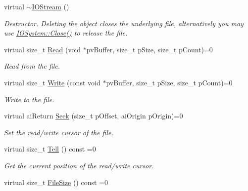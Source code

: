 \begin{DoxyCompactItemize}
\item 
\hypertarget{class_assimp_1_1_i_o_stream_a6cedc5033bf531bf14b97d1c9b788de8}{virtual \hyperlink{class_assimp_1_1_i_o_stream_a6cedc5033bf531bf14b97d1c9b788de8}{$\sim$\+I\+O\+Stream} ()}\label{class_assimp_1_1_i_o_stream_a6cedc5033bf531bf14b97d1c9b788de8}

\begin{DoxyCompactList}\small\item\em Destructor. Deleting the object closes the underlying file, alternatively you may use \hyperlink{class_assimp_1_1_i_o_system_a8c334d60f04bceeb6bd0157d21723f3e}{I\+O\+System\+::\+Close()} to release the file. \end{DoxyCompactList}\item 
virtual size\+\_\+t \hyperlink{class_assimp_1_1_i_o_stream_ae376f641020989d61863b9c6f55c7abf}{Read} (void $\ast$pv\+Buffer, size\+\_\+t p\+Size, size\+\_\+t p\+Count)=0
\begin{DoxyCompactList}\small\item\em Read from the file. \end{DoxyCompactList}\item 
virtual size\+\_\+t \hyperlink{class_assimp_1_1_i_o_stream_ad0ca4aae1b8c4d00db391ac3a4171f7b}{Write} (const void $\ast$pv\+Buffer, size\+\_\+t p\+Size, size\+\_\+t p\+Count)=0
\begin{DoxyCompactList}\small\item\em Write to the file. \end{DoxyCompactList}\item 
virtual ai\+Return \hyperlink{class_assimp_1_1_i_o_stream_a5ed0dddf418ab08cf3fc21f3f3032220}{Seek} (size\+\_\+t p\+Offset, ai\+Origin p\+Origin)=0
\begin{DoxyCompactList}\small\item\em Set the read/write cursor of the file. \end{DoxyCompactList}\item 
virtual size\+\_\+t \hyperlink{class_assimp_1_1_i_o_stream_a316ac6cd16b5a493d1313f792c806194}{Tell} () const =0
\begin{DoxyCompactList}\small\item\em Get the current position of the read/write cursor. \end{DoxyCompactList}\item 
\hypertarget{class_assimp_1_1_i_o_stream_aaa01183d197fb714f28d6c611b6fa058}{virtual size\+\_\+t \hyperlink{class_assimp_1_1_i_o_stream_aaa01183d197fb714f28d6c611b6fa058}{File\+Size} () const =0}\label{class_assimp_1_1_i_o_stream_aaa01183d197fb714f28d6c611b6fa058}


\end{DoxyCompactItemize}
